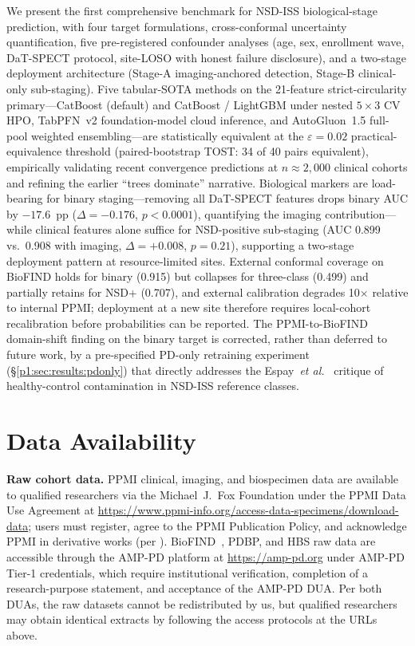 We present the first comprehensive benchmark for NSD-ISS biological-stage prediction, with four target formulations, cross-conformal uncertainty quantification, five pre-registered confounder analyses (age, sex, enrollment wave, DaT-SPECT protocol, site-LOSO with honest failure disclosure), and a two-stage deployment architecture (Stage-A imaging-anchored detection, Stage-B clinical-only sub-staging). Five tabular-SOTA methods on the 21-feature strict-circularity primary---CatBoost (default) and CatBoost / LightGBM under nested $5{\times}3$ CV HPO, TabPFN~v2 foundation-model cloud inference, and AutoGluon~1.5 full-pool weighted ensembling---are statistically equivalent at the $\varepsilon{=}0.02$ practical-equivalence threshold (paired-bootstrap TOST: 34 of 40 pairs equivalent), empirically validating recent convergence predictions at $n \approx 2{,}000$ clinical cohorts and refining the earlier ``trees dominate'' narrative. Biological markers are load-bearing for binary staging---removing all DaT-SPECT features drops binary AUC by $-17.6$~pp ($\Delta{=}-0.176$, $p{<}0.0001$), quantifying the imaging contribution---while clinical features alone suffice for NSD-positive sub-staging (AUC 0.899 vs.\ 0.908 with imaging, $\Delta{=}+0.008$, $p{=}0.21$), supporting a two-stage deployment pattern at resource-limited sites. External conformal coverage on BioFIND holds for binary (0.915) but collapses for three-class (0.499) and partially retains for NSD+ (0.707), and external calibration degrades 10$\times$ relative to internal PPMI; deployment at a new site therefore requires local-cohort recalibration before probabilities can be reported. The PPMI-to-BioFIND domain-shift finding on the binary target is corrected, rather than deferred to future work, by a pre-specified PD-only retraining experiment (\S\ref{p1:sec:results:pdonly}) that directly addresses the Espay~\textit{et al.}~\cite{espay2025med} critique of healthy-control contamination in NSD-ISS reference classes.

\section*{Data Availability}
\label{p1:sec:data-availability}
\textbf{Raw cohort data.} PPMI clinical, imaging, and biospecimen data are available to qualified researchers via the Michael~J.~Fox Foundation under the PPMI Data Use Agreement at \url{https://www.ppmi-info.org/access-data-specimens/download-data}; users must register, agree to the PPMI Publication Policy, and acknowledge PPMI in derivative works (per \cite{marek2018ppmi}). BioFIND~\cite{russo2025}, PDBP, and HBS raw data are accessible through the AMP-PD platform at \url{https://amp-pd.org} under AMP-PD Tier-1 credentials, which require institutional verification, completion of a research-purpose statement, and acceptance of the AMP-PD DUA. Per both DUAs, the raw datasets cannot be redistributed by us, but qualified researchers may obtain identical extracts by following the access protocols at the URLs above.

